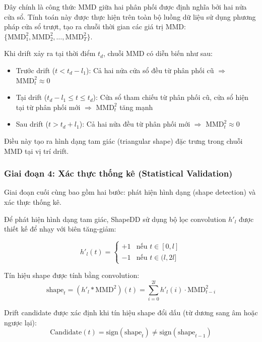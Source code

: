 Đây chính là công thức MMD giữa hai phân phối được định nghĩa bởi hai nửa cửa sổ. Tính toán này được thực hiện trên toàn bộ luồng dữ liệu sử dụng phương pháp cửa sổ trượt, tạo ra chuỗi thời gian các giá trị MMD: $\{\text{MMD}^2_1, \text{MMD}^2_2, \ldots, \text{MMD}^2_T\}$.

Khi drift xảy ra tại thời điểm $t_d$, chuỗi MMD có diễn biến như sau:
\begin{itemize}
	\item Trước drift ($t < t_d - l_1$): Cả hai nửa cửa sổ đều từ phân phối cũ $\Rightarrow$ $\text{MMD}^2_t \approx 0$
	\item Tại drift ($t_d - l_1 \leq t \leq t_d$): Cửa sổ tham chiếu từ phân phối cũ, cửa sổ hiện tại từ phân phối mới $\Rightarrow$ $\text{MMD}^2_t$ tăng mạnh
	\item Sau drift ($t > t_d + l_1$): Cả hai nửa đều từ phân phối mới $\Rightarrow$ $\text{MMD}^2_t \approx 0$
\end{itemize}

Điều này tạo ra hình dạng tam giác (triangular shape) đặc trưng trong chuỗi MMD tại vị trí drift.

\subsubsection{Giai đoạn 4: Xác thực thống kê (Statistical Validation)}

Giai đoạn cuối cùng bao gồm hai bước: phát hiện hình dạng (shape detection) và xác thực thống kê.

Để phát hiện hình dạng tam giác, ShapeDD sử dụng bộ lọc convolution $h'_l$ được thiết kế để nhạy với biên tăng-giảm:

\begin{equation}
	h'_l(t) = \begin{cases}
		+1 & \text{nếu } t \in [0, l]  \\
		-1 & \text{nếu } t \in (l, 2l]
	\end{cases}
\end{equation}

Tín hiệu shape được tính bằng convolution:
\begin{equation}
	\text{shape}_t = (h'_l * \text{MMD}^2)(t) = \sum_{i=0}^{2l} h'_l(i) \cdot \text{MMD}^2_{t-i}
\end{equation}

Drift candidate được xác định khi tín hiệu shape đổi dấu (từ dương sang âm hoặc ngược lại):
\begin{equation}
	\text{Candidate}(t) = \text{sign}(\text{shape}_t) \neq \text{sign}(\text{shape}_{t-1})
\end{equation}

